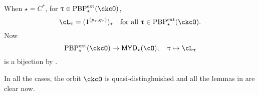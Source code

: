 \documentclass[12pt,a4paper]{amsart}
\def\MYD{{\mathsf{MYD}}}
\def\Forall{\text{for all }}
\def\ac{\cL}
\numberwithin{equation}{section}
\newtheorem{lem}[thm]{Lemma}
\theoremstyle{remark}
\def\dpeNil{\Nil^{\mathrm{dpe}}}
\def\ssign{\mathrm{Sign}}
\def\Thetab{\bar{\Theta}}
\def\drc{\mathrm{DRC}}
\def\LLS{\mathrm{{}^{\ell} LS}}
\def\PBPes{\mathrm{PBP}^{\mathrm{ext}}_{\star}}
\def\uptaup{\uptau^{\prime}}
\begin{document}
When $\star = C^{*}$, for $\uptau\in \PBPes(\ckcO)$,
\[
  \ac_{\uptau} = (1^{(p_{\tau},q_{\tau})})_{\star}\quad \Forall \uptau\in \PBPes(\ckcO).
\]
Now
\[
    \PBPes(\ckcO) \rightarrow  \MYD_{\star}(\cO), \quad
    \uptau \mapsto \ac_{\uptau}
\]
is a bijection by .

In all the cases, the orbit $\ckcO$ is quasi-distinghuished and all the lemmas
in  are clear now.





\end{document}

